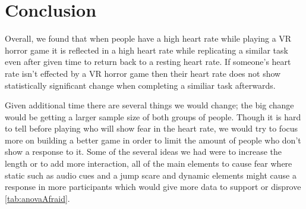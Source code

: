 \documentclass[manuscript,screen,review]{acmart}
\begin{document}
\section{Conclusion}
Overall, we found that when people have a high heart rate while playing a VR horror game it is reflected in a high heart rate while replicating a similar task even after given time to return back to a resting heart rate. If someone's heart rate isn't effected by a VR horror game then their heart rate does not show statistically significant change when completing a similiar task afterwards. 

Given additional time there are several things we would change; the big change would be getting a larger sample size of both groups of people. Though it is hard to tell before playing who will show fear in the heart rate, we would try to focus more on building a better game in order to limit the amount of people who don't show a response to it. Some of the several ideas we had were to increase the length or to add more interaction, all of the main elements to cause fear where static such as audio cues and a jump scare and dynamic elements might cause a response in more participants which would give more data to support or disprove \autoref{tab:anovaAfraid}.



\end{document}
